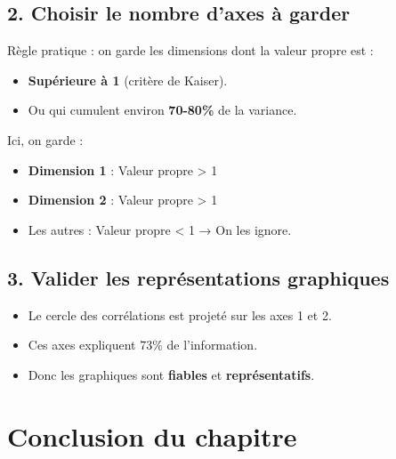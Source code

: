 \documentclass[12pt,a4paper]{book}
\begin{document}
	\subsection{2. Choisir le nombre d'axes à garder}
	
	Règle pratique : on garde les dimensions dont la valeur propre est :
	\begin{itemize}
		\item \textbf{Supérieure à 1} (critère de Kaiser).
		\item Ou qui cumulent environ \textbf{70-80\%} de la variance.
	\end{itemize}
	
	Ici, on garde :
	\begin{itemize}
		\item \textbf{Dimension 1} : Valeur propre > 1
		\item \textbf{Dimension 2} : Valeur propre > 1
		\item Les autres : Valeur propre < 1 → On les ignore.
	\end{itemize}
	
	\subsection{3. Valider les représentations graphiques}
	
	\begin{itemize}
		\item Le cercle des corrélations est projeté sur les axes 1 et 2.
		\item Ces axes expliquent 73\% de l'information.
		\item Donc les graphiques sont \textbf{fiables} et \textbf{représentatifs}.
	\end{itemize}
	
	\section{Conclusion du chapitre}
	
	\begin{center}
	\end{center}
	
\end{document}
